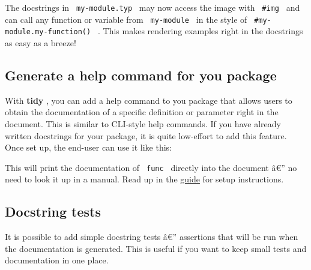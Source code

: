 The docstrings in \texttt{\ my-module.typ\ } may now access the image
with \texttt{\ \#img\ } and can call any function or variable from
\texttt{\ my-module\ } in the style of
\texttt{\ \#my-module.my-function()\ } . This makes rendering examples
right in the docstrings as easy as a breeze!

\subsection{Generate a help command for you
package}\label{generate-a-help-command-for-you-package}

With \textbf{tidy} , you can add a help command to you package that
allows users to obtain the documentation of a specific definition or
parameter right in the document. This is similar to CLI-style help
commands. If you have already written docstrings for your package, it is
quite low-effort to add this feature. Once set up, the end-user can use
it like this:

\begin{Shaded}
\begin{Highlighting}[]

\end{Highlighting}
\end{Shaded}

This will print the documentation of \texttt{\ func\ } directly into the
document â€'' no need to look it up in a manual. Read up in the
\href{https://github.com/Mc-Zen/tidy/releases/download/v0.3.0/tidy-guide.pdf}{guide}
for setup instructions.

\subsection{Docstring tests}\label{docstring-tests}

It is possible to add simple docstring tests â€'' assertions that will
be run when the documentation is generated. This is useful if you want
to keep small tests and documentation in one place.

\begin{Shaded}
\begin{Highlighting}[]
\NormalTok{/// )}
\end{Highlighting}
\end{Shaded}

